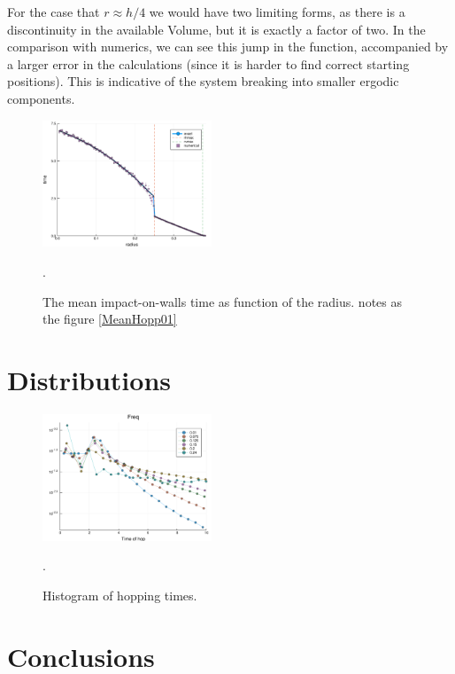 \documentclass[superscriptaddress,pre,reprint,showpacs,twocolumn]{revtex4-1}
\begin{document}
For the case that $r\approx h/4$ we would have two limiting forms,
as there is a discontinuity in the available Volume, but it is exactly
a factor of two. In the comparison with numerics, we can see
this jump in the function, accompanied by a larger error in the
calculations (since it is harder to find correct starting positions). 
This is indicative of 
the system breaking into smaller ergodic components.


\begin{figure}[h]
  \centering
  \includegraphics[width=0.45\textwidth]{./figures/HitRightWall01.pdf}
  \caption{The mean impact-on-walls time as function of the radius. 
    notes as the figure \ref{MeanHopp01}}
    \label{MeanImp01}.
\end{figure}



%
\section{Distributions}

%
%
%


\begin{figure}[h]
  \centering
  \includegraphics[width=0.45\textwidth]{figures/histogram_hopping_times.pdf}
  \caption{Histogram of hopping times.}
    \label{histogram_hopping}.
\end{figure}


\section{Conclusions}
\end{document}
